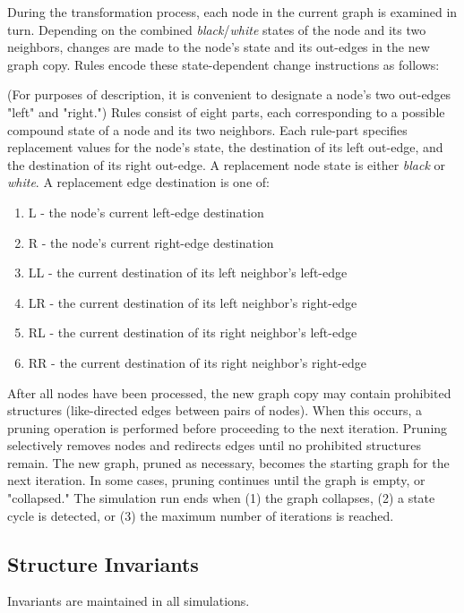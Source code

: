 \documentclass[twoside,twocolumn]{article}
\begin{document}
During the transformation process, each node in the current graph is examined in turn.
Depending on the combined \textit{black}/\textit{white}
states of the node and its two neighbors, changes are made to the node's
state and its out-edges in the new graph copy. Rules encode these state-dependent change
instructions as follows:

(For purposes of description, it is convenient to designate a node's two out-edges "left" and "right.")
Rules consist of eight parts, each corresponding to a possible compound state of a node and its
two neighbors. Each rule-part specifies replacement values for
the node's state, the destination of its left out-edge, and the destination of its right
out-edge. A replacement node state is either \textit{black} or \textit{white}.
A replacement edge destination is one of:

\begin{enumerate}
    \item L - the node's current left-edge destination
    \item R - the node's current right-edge destination
    \item LL - the current destination of its left neighbor's left-edge
    \item LR - the current destination of its left neighbor's right-edge
    \item RL - the current destination of its right neighbor's left-edge
    \item RR - the current destination of its right neighbor's right-edge
\end{enumerate}

After all nodes have been processed, the new graph copy may
contain prohibited structures (like-directed edges between pairs of nodes).
When this occurs, a pruning operation is
performed before proceeding to the next iteration. Pruning selectively removes
nodes and redirects edges until no prohibited structures remain.
The new graph, pruned as necessary, becomes the starting graph for the next iteration.
In some cases, pruning continues until the graph is empty, or "collapsed."
The simulation run ends when (1) the graph collapses, (2) a state cycle is detected,
or (3) the maximum number of iterations is reached.

\subsection{Structure Invariants}

Invariants are maintained in all simulations.
\end{document}
